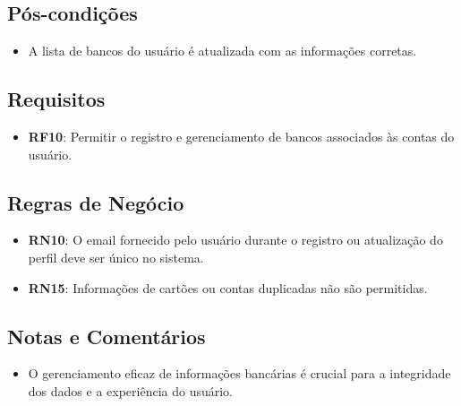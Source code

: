 \subsection*{Pós-condições}
\begin{addmargin}[1.5cm]{0cm}
    \begin{itemize}
        \item A lista de bancos do usuário é atualizada com as informações corretas.
    \end{itemize}
\end{addmargin}

\subsection*{Requisitos}
\begin{addmargin}[1.5cm]{0cm}
	\begin{itemize}
        \item \textbf{RF10}: Permitir o registro e gerenciamento de bancos associados às contas do usuário.
	\end{itemize}
\end{addmargin}

\subsection*{Regras de Negócio}
\begin{addmargin}[1.5cm]{0cm}
    \begin{itemize}
        \item \textbf{RN10}: O email fornecido pelo usuário durante o registro ou atualização do perfil deve ser único no sistema.
        \item \textbf{RN15}: Informações de cartões ou contas duplicadas não são permitidas.
    \end{itemize}
\end{addmargin}

\subsection*{Notas e Comentários}
\begin{addmargin}[1.5cm]{0cm}
    \begin{itemize}
        \item O gerenciamento eficaz de informações bancárias é crucial para a integridade dos dados e a experiência do usuário.
    \end{itemize}
\end{addmargin}
